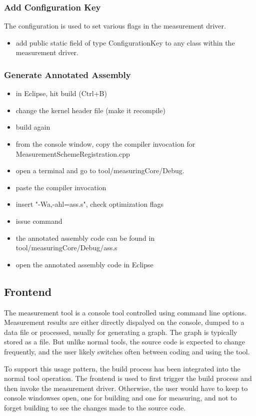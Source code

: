 \documentclass[a4paper,12pt]{article}
\begin{document}
\subsubsection{Add Configuration Key}
The configuration is used to set various flags in the measurement driver.
\begin{itemize}
\item add public static field of type ConfigurationKey to any class within the
measurement driver.
\end{itemize}

\subsubsection{Generate Annotated Assembly}
\begin{itemize}
\item in Eclipse, hit build (Ctrl+B)
\item change the kernel header file (make it recompile)
\item build again
\item from the console window, copy the compiler invocation for
MeasurementSchemeRegistration.cpp
\item open a terminal and go to tool/measuringCore/Debug.
\item paste the compiler invocation
\item insert "-Wa,-ahl=ass.s", check optimization flags
\item issue command
\item the annotated assembly code can be found in tool/measuringCore/Debug/ass.s
\item open the annotated assembly code in Eclipse
\end{itemize}

\subsection{Frontend}
The measurement tool is a console tool controlled using command line options.
Measurement results are either directly dispalyed on the console, dumped to a
data file or processed, usually for generating a graph. The graph is typically
stored as a file. But unlike normal tools, the source code is expected to change
frequently, and the user likely switches often between coding and using the
tool.

To support this usage pattern, the build process has been integrated into the
normal tool operation. The frontend is used to first trigger the build process
and then invoke the measurement driver. Otherwise, the user would have to keep
to console windowses open, one for building and one for measuring, and not to
forget building to see the changes made to the source code.
\end{document}
